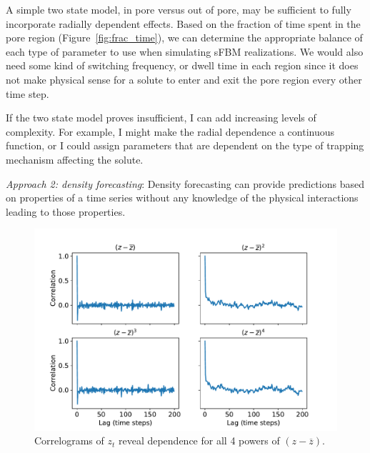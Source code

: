 \documentclass{article}
\begin{document}
  A simple two state model, in pore versus out of pore, may be sufficient to 
  fully incorporate radially dependent effects. Based on the fraction of time 
  spent in the pore region (Figure~\ref{fig:frac_time}), we can determine
  the appropriate balance of each type of parameter to use when simulating sFBM
  realizations. We would also need some kind of switching frequency, or dwell
  time in each region since it does not make physical sense for a solute to 
  enter and exit the pore region every other time step.
  
  If the two state model proves insufficient, I can add increasing levels of
  complexity. For example, I might make the radial dependence a continuous 
  function, or I could assign parameters that are dependent on the type of
  trapping mechanism affecting the solute.

  \textit{Approach 2: density forecasting}: Density forecasting can provide
  predictions based on properties of a time series without any knowledge
  of the physical interactions leading to those properties. 
  
  \begin{figure}
  \centering
  \vspace{-0.75cm}
  \includegraphics[width=\linewidth]{correlograms.pdf}
  \caption{Correlograms of $z_t$ reveal dependence for all 4 powers of 
  $(z - \overline{z})$.}\label{fig:correlograms}
  \vspace{-0.5cm}
  \end{figure}
  
\end{document}
